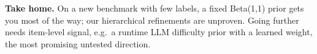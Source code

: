 \documentclass{article}
\begin{document}
\begin{minipage}[t]{0.488\linewidth}
\begin{tcolorbox}[key, after skip=0pt]
\raggedright\textbf{Take home.} On a new benchmark with few labels, a fixed Beta(1,1) prior gets you most of the way;
our hierarchical refinements are unproven. Going further needs item-level signal, e.g.\ a runtime LLM difficulty prior
with a learned weight, the most promising untested direction.
\end{tcolorbox}

\end{minipage}
\end{document}
